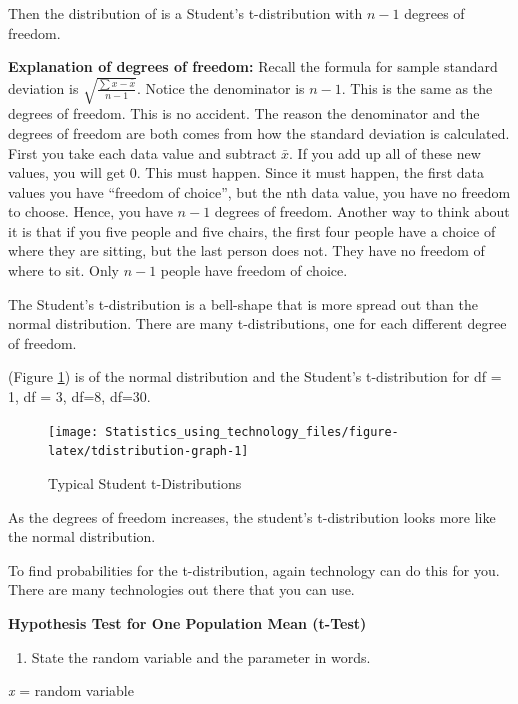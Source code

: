 \documentclass[
]{book}
\providecommand{\tightlist}{%
  \setlength{\itemsep}{0pt}\setlength{\parskip}{0pt}}
\begin{document}
Then the distribution of is a Student's t-distribution with \(n-1\) degrees of freedom.

\textbf{Explanation of degrees of freedom:} Recall the formula for sample standard deviation is \(\sqrt{{\frac{\sum{x-\bar{x}}}{n-1}}}\). Notice the denominator is \(n-1\). This is the same as the degrees of freedom. This is no accident. The reason the denominator and the degrees of freedom are both comes from how the standard deviation is calculated. First you take each data value and subtract \(\bar{x}\). If you add up all of these new values, you will get 0. This must happen. Since it must happen, the first data values you have ``freedom of choice'', but the nth data value, you have no freedom to choose. Hence, you have \(n-1\) degrees of freedom. Another way to think about it is that if you five people and five chairs, the first four people have a choice of where they are sitting, but the last person does not. They have no freedom of where to sit. Only \(n-1\) people have freedom of choice.

The Student's t-distribution is a bell-shape that is more spread out than the normal distribution. There are many t-distributions, one for each different degree of freedom.

(Figure \ref{fig:tdistribution-graph}) is of the normal distribution and the Student's t-distribution for df = 1, df = 3, df=8, df=30.



\begin{figure}
\texttt{[image: Statistics\_using\_technology\_files/figure-latex/tdistribution-graph-1]} \caption{Typical Student t-Distributions}\label{fig:tdistribution-graph}
\end{figure}

As the degrees of freedom increases, the student's t-distribution looks
more like the normal distribution.

To find probabilities for the t-distribution, again technology can do this for you. There are many technologies out there that you can use.

\textbf{Hypothesis Test for One Population Mean (t-Test)}

\begin{enumerate}
\def\labelenumi{\arabic{enumi}.}
\tightlist
\item
  State the random variable and the parameter in words.
\end{enumerate}

\emph{x} = random variable
\end{document}
